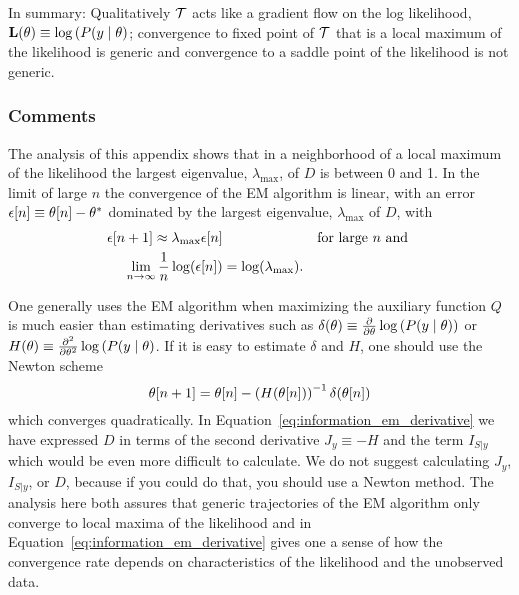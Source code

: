 In summary: Qualitatively $\EMmap$ acts like a gradient flow on the
log likelihood,
${\bf L}(\theta) \equiv\log \left( P(y \mid \theta
\right)$; convergence to fixed point of $\EMmap$ that is a local
maximum of the likelihood is generic and convergence to a saddle point
of the likelihood is not generic.

\subsubsection{Comments}
\label{sec:ConvergenceRate}

The analysis of this appendix shows that in a neighborhood of a local
maximum of the likelihood the largest eigenvalue,
$\lambda_{\text{max}}$, of $D$ is between 0 and 1.  In the limit of
large $n$ the convergence of the EM algorithm is linear, with an error
${\epsilon}{[n]} \equiv {\theta}{[n]} - {\theta^*}$
dominated by the largest eigenvalue, $\lambda_{\text{max}}$ of $D$,
with
\begin{align*}
  {\epsilon}{[n+1]} \approx \lambda_{\text{max}} {\epsilon}{[n]}
  &&\text{for large } n \text{ and }\\
  \lim_{n \rightarrow \infty} \frac{1}{n}\log({\epsilon}{[n]}) &= \log(\lambda_{\text{max}}).
\end{align*}

One generally uses the EM algorithm when maximizing the auxiliary
function $Q$ is much easier than estimating derivatives such as
$\delta(\theta) \equiv \frac{\partial}{\partial \theta} \log
\left( P(y \mid \theta )\right)$ or
$H(\theta) \equiv \frac{\partial^2}{\partial \theta^2} \log
\left( P(y \mid \theta \right)$.  If it is easy to estimate
$\delta$ and $H$, one should use the Newton scheme
\begin{equation*}
  {\theta}{[n+1]} = {\theta}{[n]} - \left(H({\theta}{[n]})\right)^{-1} \delta({\theta}{[n]})
\end{equation*}
which converges quadratically.  In
Equation~\eqref{eq:information_em_derivative} we have expressed $D$ in
terms of the second derivative $J_y\equiv -H$ and the term $I_{S|y}$
which would be even more difficult to calculate.  We do not suggest
calculating $J_y$, $I_{S|y}$, or $D$, because if you could do that,
you should use a Newton method.  The analysis here both assures that
generic trajectories of the EM algorithm only converge to local maxima
of the likelihood and in Equation~\eqref{eq:information_em_derivative}
gives one a sense of how the convergence rate depends on
characteristics of the likelihood and the unobserved data.
